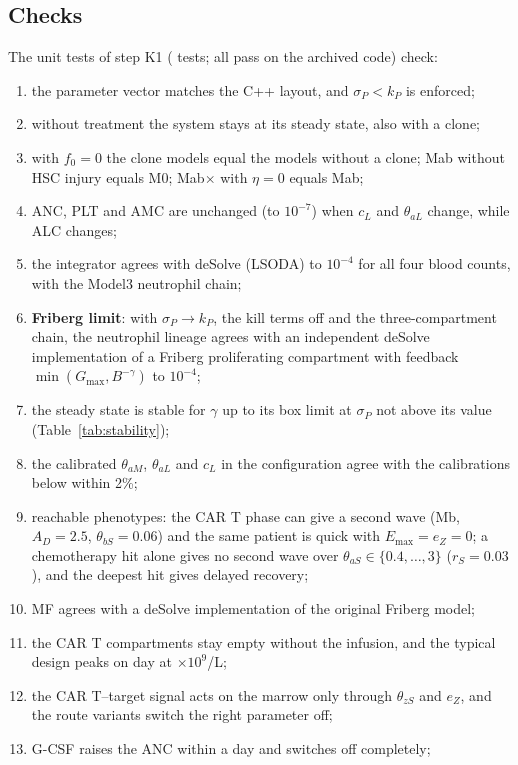 \documentclass[11pt]{article}
\begin{document}
\subsection{Checks}
The unit tests of step K1 (\valTestsN{} tests; all pass on the archived code) check:
\begin{enumerate}
\item the parameter vector matches the C++ layout, and $\sigma_P<k_P$ is enforced;
\item without treatment the system stays at its steady state, also with a clone;
\item with $f_0=0$ the clone models equal the models without a clone; Mab without HSC injury equals M0; Mab$\times$ with $\eta=0$ equals Mab;
\item ANC, PLT and AMC are unchanged (to $10^{-7}$) when $c_L$ and $\theta_{aL}$ change, while ALC changes;
\item the integrator agrees with deSolve (LSODA) to $10^{-4}$ for all four blood counts, with the Model3 neutrophil chain;
\item \textbf{Friberg limit}: with $\sigma_P\to k_P$, the kill terms off and the three-compartment chain, the neutrophil lineage agrees with an independent deSolve implementation of a Friberg proliferating compartment with feedback $\min(G_{\max},B^{-\gamma})$ to $10^{-4}$;
\item the steady state is stable for $\gamma$ up to its box limit at $\sigma_P$ not above its value (Table~\ref{tab:stability});
\item the calibrated $\theta_{aM}$, $\theta_{aL}$ and $c_L$ in the configuration agree with the calibrations below within 2\%;
\item reachable phenotypes: the CAR T phase can give a second wave (Mb, $A_D=2.5$, $\theta_{bS}=0.06$) and the same patient is quick with $E_{\max}=e_Z=0$; a chemotherapy hit alone gives no second wave over $\theta_{aS}\in\{0.4,\dots,3\}$ ($r_S=0.03$), and the deepest hit gives delayed recovery;
\item MF agrees with a deSolve implementation of the original Friberg model;
\item the CAR T compartments stay empty without the infusion, and the typical design peaks on day \valCartPeakDay{} at \valCartPeak{} $\times10^9$/L;
\item the CAR T--target signal acts on the marrow only through $\theta_{zS}$ and $e_Z$, and the route variants switch the right parameter off;
\item G-CSF raises the ANC within a day and switches off completely;

\end{enumerate}
\end{document}
